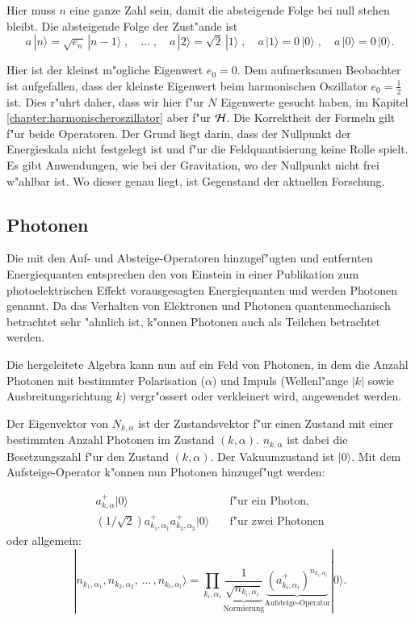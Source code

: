 \begin{refsection}
Hier muss $n$ eine ganze Zahl sein, damit die absteigende Folge bei null stehen bleibt. Die absteigende Folge der Zust"ande ist
\begin{equation*}
a\,|n\rangle = \sqrt{e_n}\,|n-1\rangle  \;, \quad \hdots \; , \quad a\,|2\rangle = \sqrt{2}\,|1\rangle \; , \quad a\,|1\rangle = 0\,|0\rangle \;, \quad a\,|0\rangle = 0\,|0\rangle.
\end{equation*}

Hier ist der kleinst m"ogliche Eigenwert $e_0 = 0$. Dem aufmerksamen Beobachter ist aufgefallen, dass der kleinste Eigenwert beim harmonischen Oszillator $e_0 = \frac{1}{2}$ ist. Dies r"uhrt daher, dass wir hier f"ur $N$ Eigenwerte gesucht haben, im Kapitel \ref{chapter:harmonischeroszillator} aber f"ur ${\cal H}$. Die Korrektheit der Formeln gilt f"ur beide Operatoren. Der Grund liegt darin, dass der Nullpunkt der Energieskala nicht festgelegt ist und f"ur die Feldquantisierung keine Rolle spielt. Es gibt Anwendungen, wie bei der Gravitation, wo der Nullpunkt nicht frei w"ahlbar ist. Wo dieser genau liegt, ist Gegenstand der aktuellen Forschung.

\subsection{Photonen}

Die mit den Auf- und Absteige-Operatoren hinzugef"ugten und entfernten Energiequanten entsprechen den von Einstein in einer Publikation zum photoelektrischen Effekt vorausgesagten Energiequanten und werden Photonen genannt. Da das Verhalten von Elektronen und Photonen quantenmechanisch betrachtet sehr "ahnlich ist, k"onnen Photonen auch als Teilchen betrachtet werden.

Die hergeleitete Algebra kann nun auf ein Feld von Photonen, in dem die Anzahl Photonen mit bestimmter Polarisation ($\alpha$) und Impuls (Wellenl"ange $|k|$ sowie Ausbreitungsrichtung $k$) vergr"ossert oder verkleinert wird, angewendet werden.

Der Eigenvektor von $N_{k,\alpha}$ ist der Zustandsvektor f"ur einen Zustand mit einer bestimmten Anzahl Photonen im Zustand $(k,\alpha)$. $n_{k,\alpha}$ ist dabei die Besetzungszahl f"ur den Zustand $(k,\alpha)$. Der Vakuumzustand ist $|0\rangle$. Mit dem Aufsteige-Operator k"onnen nun Photonen hinzugef"ugt werden:

\begin{align*}
a^+_{k,\alpha}|0\rangle & \quad \text{f"ur ein Photon,}\\
\left(1/\sqrt{2}\right)a^+_{k_1,\alpha_1}a^+_{k_2,\alpha_2}|0\rangle & \quad \text{f"ur zwei Photonen}
\end{align*}
oder allgemein:
\begin{equation*}
|n_{k_1,\alpha_1}, n_{k_2,\alpha_2}, \, \hdots \, , n_{k_l,\alpha_l}\rangle =
 \prod_{k_i,\alpha_i}\underbrace{\frac{1}{\sqrt{n_{k_i,\alpha_i}}}}_{\text{Normierung}} \underbrace{\left(a^+_{k_i,\alpha_i}\right)^{n_{k_i,\alpha_i}}}_{\text{Aufsteige-Operator}} |0\rangle.
\end{equation*}


\end{refsection}
